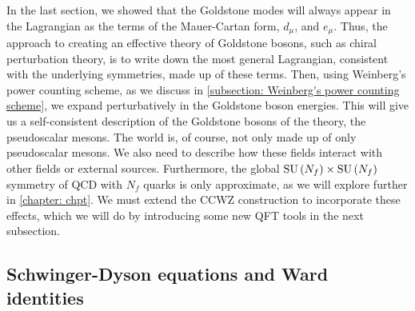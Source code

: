 In the last section, we showed that the Goldstone modes will always appear in the Lagrangian as the terms of the Mauer-Cartan form, $d_\mu$, and $e_\mu$.
Thus, the approach to creating an effective theory of Goldstone bosons, such as chiral perturbation theory, is to write down the most general Lagrangian, consistent with the underlying symmetries, made up of these terms.
Then, using Weinberg's power counting scheme, as we discuss in \autoref{subsection: Weinberg's power counting scheme}, we expand perturbatively in the Goldstone boson energies.
This will give us a self-consistent description of the Goldstone bosons of the theory, the pseudoscalar mesons.
The world is, of course, not only made up of only pseudoscalar mesons.
We also need to describe how these fields interact with other fields or external sources.
Furthermore, the global $\text{SU}\left(N_f\right)\times\text{SU}\left(N_f\right)$ symmetry of QCD with $N_f$ quarks is only approximate, as we will explore further in \autoref{chapter: chpt}.
We must extend the CCWZ construction to incorporate these effects, which we will do by introducing some new QFT tools in the next subsection.



\subsection{Schwinger-Dyson equations and Ward identities}
\label{subsection: ward identities}


